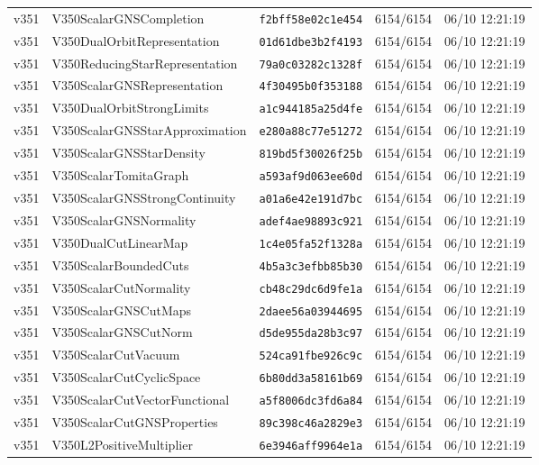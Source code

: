 \documentclass[11pt]{article}
\theoremstyle{definition}\newtheorem{deriv}{Derivation}
\begin{document}
{\begin{longtable}{@{}lllll@{}}
v351 & V350ScalarGNSCompletion & \texttt{f2bff58e02c1e454} & 6154/6154 & 06/10 12:21:19 \\
v351 & V350DualOrbitRepresentation & \texttt{01d61dbe3b2f4193} & 6154/6154 & 06/10 12:21:19 \\
v351 & V350ReducingStarRepresentation & \texttt{79a0c03282c1328f} & 6154/6154 & 06/10 12:21:19 \\
v351 & V350ScalarGNSRepresentation & \texttt{4f30495b0f353188} & 6154/6154 & 06/10 12:21:19 \\
v351 & V350DualOrbitStrongLimits & \texttt{a1c944185a25d4fe} & 6154/6154 & 06/10 12:21:19 \\
v351 & V350ScalarGNSStarApproximation & \texttt{e280a88c77e51272} & 6154/6154 & 06/10 12:21:19 \\
v351 & V350ScalarGNSStarDensity & \texttt{819bd5f30026f25b} & 6154/6154 & 06/10 12:21:19 \\
v351 & V350ScalarTomitaGraph & \texttt{a593af9d063ee60d} & 6154/6154 & 06/10 12:21:19 \\
v351 & V350ScalarGNSStrongContinuity & \texttt{a01a6e42e191d7bc} & 6154/6154 & 06/10 12:21:19 \\
v351 & V350ScalarGNSNormality & \texttt{adef4ae98893c921} & 6154/6154 & 06/10 12:21:19 \\
v351 & V350DualCutLinearMap & \texttt{1c4e05fa52f1328a} & 6154/6154 & 06/10 12:21:19 \\
v351 & V350ScalarBoundedCuts & \texttt{4b5a3c3efbb85b30} & 6154/6154 & 06/10 12:21:19 \\
v351 & V350ScalarCutNormality & \texttt{cb48c29dc6d9fe1a} & 6154/6154 & 06/10 12:21:19 \\
v351 & V350ScalarGNSCutMaps & \texttt{2daee56a03944695} & 6154/6154 & 06/10 12:21:19 \\
v351 & V350ScalarGNSCutNorm & \texttt{d5de955da28b3c97} & 6154/6154 & 06/10 12:21:19 \\
v351 & V350ScalarCutVacuum & \texttt{524ca91fbe926c9c} & 6154/6154 & 06/10 12:21:19 \\
v351 & V350ScalarCutCyclicSpace & \texttt{6b80dd3a58161b69} & 6154/6154 & 06/10 12:21:19 \\
v351 & V350ScalarCutVectorFunctional & \texttt{a5f8006dc3fd6a84} & 6154/6154 & 06/10 12:21:19 \\
v351 & V350ScalarCutGNSProperties & \texttt{89c398c46a2829e3} & 6154/6154 & 06/10 12:21:19 \\
v351 & V350L2PositiveMultiplier & \texttt{6e3946aff9964e1a} & 6154/6154 & 06/10 12:21:19 \\

\end{longtable}}
\end{document}
